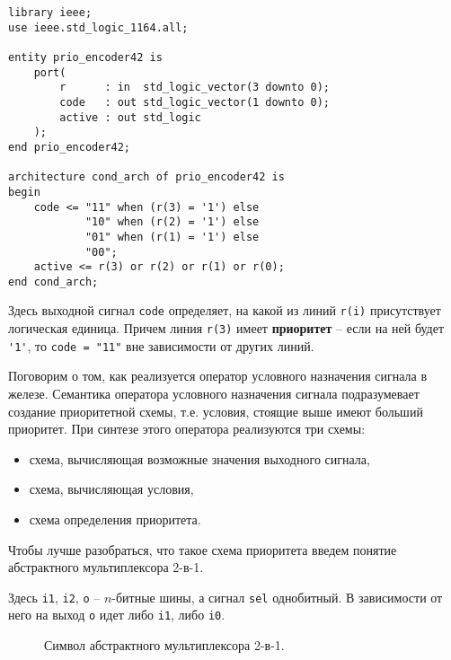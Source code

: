 \begin{Code}
\begin{lstlisting}
library ieee;
use ieee.std_logic_1164.all;

entity prio_encoder42 is
    port(
        r      : in  std_logic_vector(3 downto 0);
        code   : out std_logic_vector(1 downto 0);
        active : out std_logic
    );
end prio_encoder42;

architecture cond_arch of prio_encoder42 is
begin
    code <= "11" when (r(3) = '1') else
            "10" when (r(2) = '1') else
            "01" when (r(1) = '1') else
            "00";
    active <= r(3) or r(2) or r(1) or r(0);
end cond_arch;
\end{lstlisting}
\end{Code}

Здесь выходной сигнал \lstinline?code? определяет, на какой из линий \lstinline?r(i)? присутствует логическая единица. Причем линия \lstinline?r(3)? имеет \textbf{приоритет} – если на ней будет \lstinline?'1'?, то \lstinline?code = "11"? вне зависимости от других линий. 

Поговорим о том, как реализуется оператор условного назначения сигнала в железе. Семантика оператора условного назначения сигнала подразумевает создание приоритетной схемы, т.е. условия, стоящие выше имеют больший приоритет. При синтезе этого оператора реализуются три схемы:
\begin{itemize}
\item схема, вычисляющая возможные значения выходного сигнала,
\item схема, вычисляющая условия,
\item схема определения приоритета.
\end{itemize}
Чтобы лучше разобраться, что такое схема приоритета введем понятие абстрактного мультиплексора 2-в-1.

Здесь \texttt{i1}, \texttt{i2}, \texttt{o} – $n$-битные шины, а сигнал \texttt{sel} однобитный. В зависимости от него на выход \texttt{o} идет либо \texttt{i1}, либо \texttt{i0}.

\begin{figure}[ht]
\centering
{}
\caption{Символ абстрактного мультиплексора 2-в-1.}
\label{abstract_mux_symb}
\end{figure}

